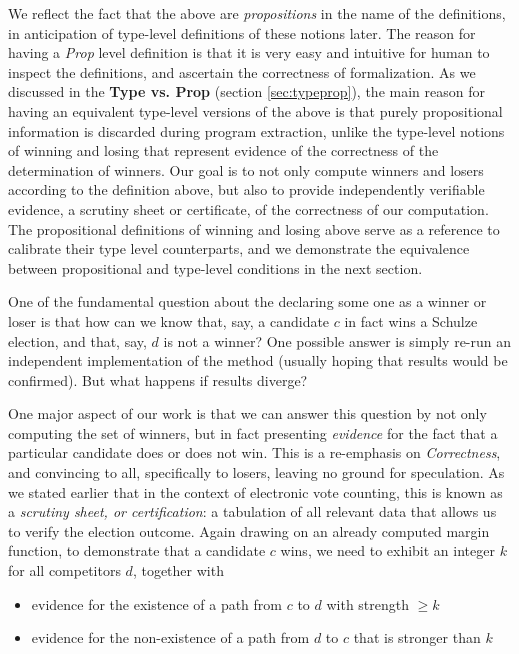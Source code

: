 \noindent
We reflect the fact that the above are \emph{propositions} in
the name of the definitions, in anticipation of type-level
definitions of these notions later. The reason for having a \textit{Prop} level definition is that 
 it is very easy  and intuitive for human to inspect the definitions, and ascertain the correctness of formalization.
As we discussed in the
\textbf{Type vs. Prop} (section \ref{sec:typeprop}), the main reason 
for having an equivalent
type-level versions of the above is that purely propositional
information is discarded during program extraction, unlike
the type-level notions of winning and losing that represent evidence
of the correctness of the determination of winners. Our goal is to 
not only compute winners and losers according to the
definition above, but also to provide independently verifiable
evidence, a scrutiny sheet or certificate, of the correctness of our computation.
The propositional
definitions of winning and losing above serve as a reference to
calibrate their type level counterparts, and we demonstrate the
equivalence between propositional and type-level conditions in the
next section. 


\label{sec:prop-type}
One of the fundamental question about the declaring some one 
as a winner or loser is that 
how can we know that, say, a candidate $c$ in fact wins a
Schulze election, and that, say, $d$ is not a winner? One possible 
answer is simply  re-run an independent implementation of the method
(usually hoping that results would be confirmed). But what happens
if results diverge?  

One major aspect of our work is that we can answer this question
by not only computing the set of winners, but in fact presenting
\emph{evidence} for the fact that a particular
candidate does or does not
win. This is a re-emphasis on \emph{Correctness},
and convincing to all, specifically to losers, leaving  no ground for speculation. 
As we stated earlier that in the context of
electronic vote counting, this is known as a
\emph{scrutiny sheet, or certification}: a tabulation of all relevant data that allows
us to verify the election outcome.
Again drawing on an already computed margin function, to
demonstrate that a candidate $c$ wins, we need to exhibit an integer
$k$ for all competitors $d$, together with
\begin{itemize}
  \item evidence for the existence of a path from $c$ to $d$ with
  strength $\geq k$
  \item evidence for the non-existence of a path from $d$ to $c$
  that is stronger than $k$
\end{itemize}


